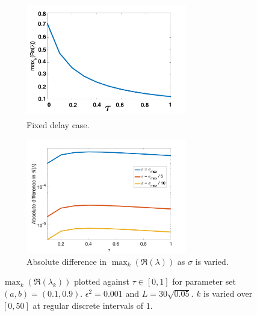 \begin{figure}[H]
    \centering
    \begin{subfigure}[b]{0.45\textwidth}
        \centering
        \includegraphics[width=7cm,height=5cm]{p2fixed.png}
        \caption{Fixed delay case.}
        \label{}
    \end{subfigure}
    \hfill
    \begin{subfigure}[b]{0.45\textwidth}
        \centering
        \includegraphics[width=7cm,height=5cm]{dispdiff1.png}
        \caption{Absolute difference in $\max_k(\Re(\lambda))$ as $\sigma$ is varied.}
        \label{}
    \end{subfigure}
    \caption{$\max_k(\Re(\lambda_k))$ plotted against $\tau\in[0,1]$ for parameter set $(a,b)=(0.1,0.9)$. $\epsilon^2=0.001$ and $L=30\sqrt{0.05}$. $k$ is varied over $[0,50]$ at regular discrete intervals of $1$.}
    \label{fig:p2}
\end{figure}
